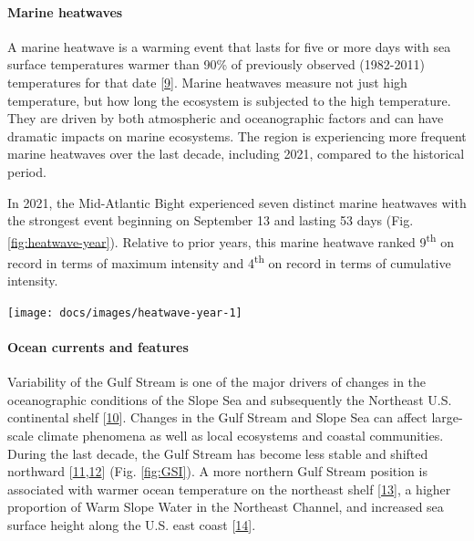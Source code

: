 \documentclass[
  10pt,
]{article}
\let\origfigure\figure
\let\endorigfigure\endfigure
\renewenvironment{figure}[1][2] {
    \expandafter\origfigure\expandafter[H]
} {
    \endorigfigure
}
\begin{document}
\hypertarget{marine-heatwaves}{%
\paragraph{Marine heatwaves}\label{marine-heatwaves}}

A marine heatwave is a warming event that lasts for five or more days
with sea surface temperatures warmer than 90\% of previously observed
(1982-2011) temperatures for that date
{[}\protect\hyperlink{ref-hobday_hierarchical_2016}{9}{]}. Marine
heatwaves measure not just high temperature, but how long the ecosystem
is subjected to the high temperature. They are driven by both
atmospheric and oceanographic factors and can have dramatic impacts on
marine ecosystems. The region is experiencing more frequent marine
heatwaves over the last decade, including 2021, compared to the
historical period.

In 2021, the Mid-Atlantic Bight experienced seven distinct marine
heatwaves with the strongest event beginning on September 13 and lasting
53 days (Fig. \ref{fig:heatwave-year}). Relative to prior years, this
marine heatwave ranked 9\textsuperscript{th} on record in terms of
maximum intensity and 4\textsuperscript{th} on record in terms of
cumulative intensity.

\begin{figure}

{\centering \texttt{[image: docs/images/heatwave-year-1]} 

}

\caption{Marine heatwave events (red shading above black line) in the Mid-Atlantic occuring in 2021.}\label{fig:heatwave-year}
\end{figure}

\hypertarget{ocean-currents-and-features}{%
\paragraph{Ocean currents and
features}\label{ocean-currents-and-features}}

Variability of the Gulf Stream is one of the major drivers of changes in
the oceanographic conditions of the Slope Sea and subsequently the
Northeast U.S. continental shelf
{[}\protect\hyperlink{ref-gangopadhyay_census_2020}{10}{]}. Changes in
the Gulf Stream and Slope Sea can affect large-scale climate phenomena
as well as local ecosystems and coastal communities. During the last
decade, the Gulf Stream has become less stable and shifted northward
{[}\protect\hyperlink{ref-andres_recent_2016}{11},\protect\hyperlink{ref-caesar_observed_2018}{12}{]}
(Fig. \ref{fig:GSI}). A more northern Gulf Stream position is associated
with warmer ocean temperature on the northeast shelf
{[}\protect\hyperlink{ref-zhang_role_2007}{13}{]}, a higher proportion
of Warm Slope Water in the Northeast Channel, and increased sea surface
height along the U.S. east coast
{[}\protect\hyperlink{ref-goddard_extreme_2015}{14}{]}.
\end{document}
